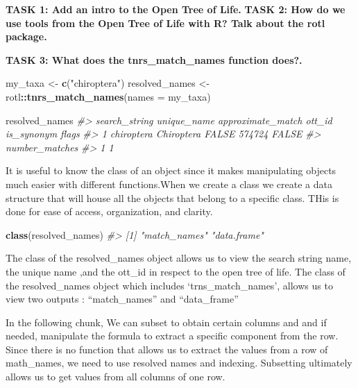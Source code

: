 \documentclass[]{article}
\newenvironment{Shaded}{\begin{snugshade}}{\end{snugshade}}
\newcommand{\CommentTok}[1]{\textcolor[rgb]{0.56,0.35,0.01}{\textit{#1}}}
\newcommand{\DataTypeTok}[1]{\textcolor[rgb]{0.13,0.29,0.53}{#1}}
\newcommand{\KeywordTok}[1]{\textcolor[rgb]{0.13,0.29,0.53}{\textbf{#1}}}
\newcommand{\NormalTok}[1]{#1}
\newcommand{\OperatorTok}[1]{\textcolor[rgb]{0.81,0.36,0.00}{\textbf{#1}}}
\newcommand{\StringTok}[1]{\textcolor[rgb]{0.31,0.60,0.02}{#1}}
\begin{document}
\textbf{TASK 1: Add an intro to the Open Tree of Life.} \textbf{TASK 2:
How do we use tools from the Open Tree of Life with R? Talk about the
rotl package.}

\textbf{TASK 3: What does the tnrs\_match\_names function does?.}

\begin{Shaded}
\begin{Highlighting}[]

\NormalTok{my_taxa <-}\StringTok{ }\KeywordTok{c}\NormalTok{(}\StringTok{"chiroptera"}\NormalTok{)}
\NormalTok{resolved_names <-}\StringTok{ }\NormalTok{rotl}\OperatorTok{::}\KeywordTok{tnrs_match_names}\NormalTok{(}\DataTypeTok{names =}\NormalTok{ my_taxa)}

\NormalTok{resolved_names}
\CommentTok{#>   search_string unique_name approximate_match ott_id is_synonym flags}
\CommentTok{#> 1    chiroptera  Chiroptera             FALSE 574724      FALSE      }
\CommentTok{#>   number_matches}
\CommentTok{#> 1              1}
\end{Highlighting}
\end{Shaded}

It is useful to know the class of an object since it makes manipulating
objects much easier with different functions.When we create a class we
create a data structure that will house all the objects that belong to a
specific class. THis is done for ease of access, organization, and
clarity.

\begin{Shaded}
\begin{Highlighting}[]
\KeywordTok{class}\NormalTok{(resolved_names)}
\CommentTok{#> [1] "match_names" "data.frame"}
\end{Highlighting}
\end{Shaded}

The class of the resolved\_names object allows us to view the search
string name, the unique name ,and the ott\_id in respect to the open
tree of life. The class of the resolved\_names object which includes
`trns\_match\_names', allows us to view two outputs : ``match\_names''
and ``data\_frame''

In the following chunk, We can subset to obtain certain columns and and
if needed, manipulate the formula to extract a specific component from
the row. Since there is no function that allows us to extract the values
from a row of math\_names, we need to use resolved names and indexing.
Subsetting ultimately allows us to get values from all columns of one
row.
\end{document}
